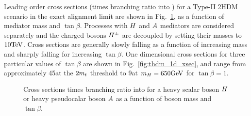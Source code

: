 Leading order cross sections (times branching ratio into \ttbar) for a Type-II 2HDM scenario in the exact alignment limit 
are shown in Fig.~\ref{fig:thdm_2d_xsecs}, as a function of mediator mass and $\tan\beta$.
Processes with $H$ and $A$ mediators
are considered separately and the charged bosons $H^\pm$ are decoupled by setting their
masses to $10\text{TeV}$. Cross sections are generally slowly falling as a function of increasing mass
and sharply falling for increasing $\tan\beta$. One dimensional cross sections
for three particular values of $\tan\beta$ are shown in Fig.~\ref{fig:thdm_1d_xsec},
and range from approximately 45\ifb at the $2m_t$ threshold to 9\ifb at $m_H=650\text{GeV}$
for $\tan\beta=1$.

\begin{figure}[htb!]
    \centering
\caption{Cross sections times branching ratio into \ttbar for a heavy scalar boson $H$ 
or heavy pseudocalar boson $A$ as a function of boson mass and $\tan\beta$.}
\label{fig:thdm_2d_xsecs}
\end{figure}

